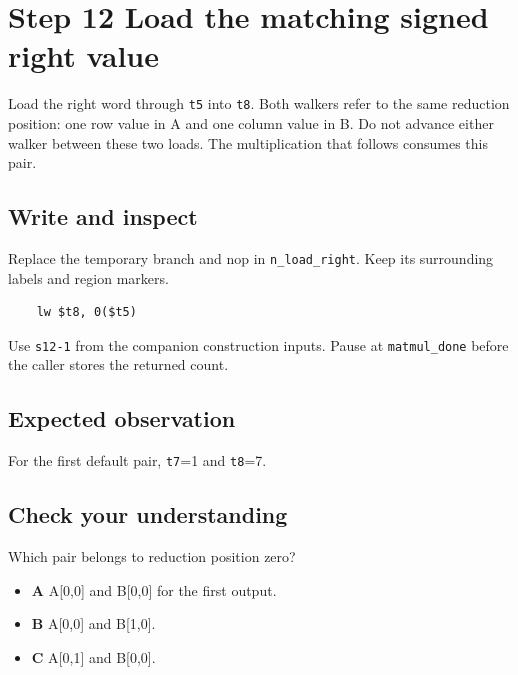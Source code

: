 \section{Step 12 Load the matching signed right value}\label{matmul-s12}

Load the right word through \texttt{t5} into \texttt{t8}. Both walkers refer to the same reduction position: one row value in A and one column value in B. Do not advance either walker between these two loads. The multiplication that follows consumes this pair.

\subsection{Write and inspect}
Replace the temporary branch and nop in \texttt{n\_load\_right}. Keep its surrounding labels and region markers.

\begin{verbatim}
    lw $t8, 0($t5)
\end{verbatim}
Use \texttt{s12-1} from the companion construction inputs. Pause at \texttt{matmul\_done} before the caller stores the returned count.

\subsection{Expected observation}
For the first default pair, \texttt{t7}=1 and \texttt{t8}=7.

\subsection{Check your understanding}
Which pair belongs to reduction position zero?

\begin{itemize}
  \item \textbf{A} A[0,0] and B[0,0] for the first output.
  \item \textbf{B} A[0,0] and B[1,0].
  \item \textbf{C} A[0,1] and B[0,0].
\end{itemize}
